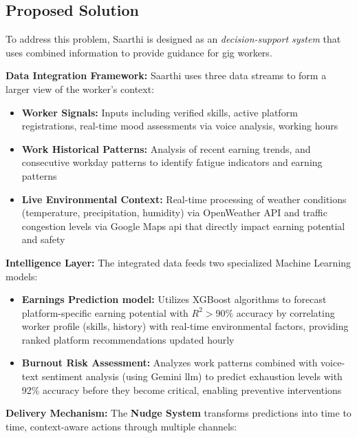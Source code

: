 \documentclass[12pt,a4paper]{article}
\begin{document}
\subsection{Proposed Solution}
\par\noindent
To address this problem, Saarthi is designed as an \textit{decision-support system} that uses combined information to provide guidance for gig workers.
\vspace{0.4cm}
\par\noindent
\textbf{Data Integration Framework:} Saarthi uses three data streams to form a larger view of the worker's context:
\begin{itemize}
    \item \textbf{Worker Signals:} Inputs including verified skills, active platform registrations, real-time mood assessments via voice analysis, working hours
    \item \textbf{Work Historical Patterns:} Analysis of recent earning trends, and consecutive workday patterns to identify fatigue indicators and earning patterns
    \item \textbf{Live Environmental Context:} Real-time processing of weather conditions (temperature, precipitation, humidity) via OpenWeather API and traffic congestion levels via Google Maps api that directly impact earning potential and safety
\end{itemize}
\vspace{0.4cm}
\par\noindent
\textbf{Intelligence Layer:} The integrated data feeds two specialized Machine Learning models:
\begin{itemize}
    \item \textbf{Earnings Prediction model:} Utilizes XGBoost algorithms to forecast platform-specific earning potential with $R^2 > 90\%$ accuracy by correlating worker profile (skills, history) with real-time environmental factors, providing ranked platform recommendations updated hourly
    \item \textbf{Burnout Risk Assessment:} Analyzes work patterns combined with voice-text sentiment analysis (using Gemini llm) to predict exhaustion levels with 92\% accuracy before they become critical, enabling preventive interventions
\end{itemize}
\vspace{0.4cm}
\par\noindent
\textbf{Delivery Mechanism:} The \textbf{Nudge System} transforms predictions into time to time, context-aware actions through multiple channels:
\end{document}
